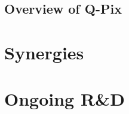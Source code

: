 \documentclass[reprint,amsmath,amssymb,aps,prl,superscriptaddress]{revtex4-1}
\begin{document}
\subsection{Overview of Q-Pix}\label{sec:QPixOverview}

\section{Synergies}\label{sec:CurrentEfforts}


\section{Ongoing R\&D}\label{sec:CurrentEfforts}
\end{document}
